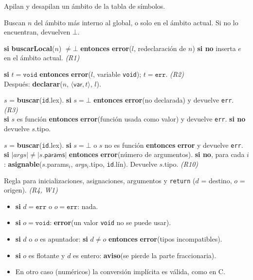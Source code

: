 \documentclass[11pt]{article}
\newcommand{\T}[1]{\textcolor{tcolor}{\texttt{#1}}}              %
\newcommand{\fn}[1]{\textsf{\textbf{#1}}}                        %
\newcommand{\ty}[1]{\texttt{#1}}                                 %
\newcommand{\kw}[1]{\textbf{#1}}                                 %
\begin{document}
\begin{description}[leftmargin=1em,style=nextline,itemsep=4pt]
\item[\fn{abrirÁmbito}(), \fn{cerrarÁmbito}()] Apilan y desapilan un ámbito de la tabla de símbolos.

\item[\fn{buscar}($n$), \fn{buscarLocal}($n$)] Buscan $n$ del ámbito más interno al global, o solo en el ámbito actual. Si no lo encuentran, devuelven $\bot$.

\item[\fn{declarar}($n$, $e$, $l$)] \kw{si} \fn{buscarLocal}($n$) $\neq \bot$ \kw{entonces} \fn{error}($l$, redeclaración de $n$) \kw{si no} inserta $e$ en el ámbito actual. \hfill \textit{(R1)}

\item[\fn{declararVar}($t$, $n$, $l$)] \kw{si} $t = \ty{void}$ \kw{entonces} \fn{error}($l$, variable \ty{void}); $t = \ty{err}$. \hfill \textit{(R2)}\\
Después: \fn{declarar}($n$, $\langle\textsf{var}, t\rangle$, $l$).

\item[\fn{usarVariable}(\T{id})] $s$ = \fn{buscar}(\T{id}.\textsf{lex}).
\kw{si} $s = \bot$ \kw{entonces} \fn{error}(no declarada) y devuelve \ty{err}. \hfill \textit{(R3)}\\
\kw{si} $s$ es función \kw{entonces} \fn{error}(función usada como valor) y devuelve \ty{err}. \kw{si no} devuelve $s$.\textsf{tipo}.

\item[\fn{llamada}(\T{id}, \textit{args})] $s$ = \fn{buscar}(\T{id}.\textsf{lex}).
\kw{si} $s = \bot$ o $s$ no es función \kw{entonces} \fn{error} y devuelve \ty{err}.
\kw{si} $|\textit{args}| \neq |s.\textsf{params}|$ \kw{entonces} \fn{error}(número de argumentos).
\kw{si no}, para cada $i$: \fn{asignable}($s$.\textsf{params}$_i$, \textit{args}$_i$.\textsf{tipo}, \T{id}.\textsf{lín}).
Devuelve $s$.\textsf{tipo}. \hfill \textit{(R10)}

\item[\fn{asignable}($d$, $o$, $l$)] Regla para inicializaciones, asignaciones, argumentos y \T{return} ($d$ = destino, $o$ = origen). \hfill \textit{(R4, W1)}
\begin{itemize}[nosep]
  \item \kw{si} $d = \ty{err}$ o $o = \ty{err}$: nada.
  \item \kw{si} $o = \ty{void}$: \fn{error}(un valor \ty{void} no se puede usar).
  \item \kw{si} $d$ o $o$ es apuntador: \kw{si} $d \neq o$ \kw{entonces} \fn{error}(tipos incompatibles).
  \item \kw{si} $o$ es flotante y $d$ es entero: \fn{aviso}(se pierde la parte fraccionaria).
  \item En otro caso (numéricos) la conversión implícita es válida, como en C.
\end{itemize}


\end{description}
\end{document}
